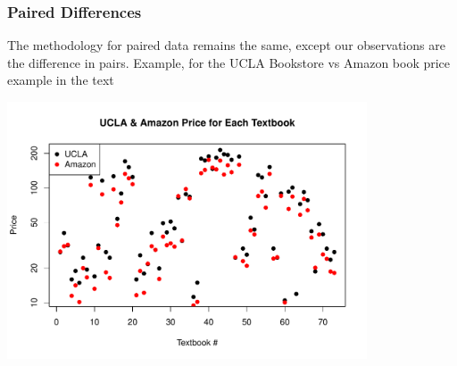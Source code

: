 \documentclass[handout]{beamer}
\newcommand{\blue}[1]{\textcolor{blue2}{#1}}
\begin{document}
%
%
\begin{frame}[fragile]
\frametitle{Paired Differences}
The methodology for paired data remains the same, except our \blue{observations} are the difference in pairs.  Example, for the UCLA Bookstore vs Amazon book price example in the text
\begin{center}
\includegraphics[width=0.8\textwidth]{figure/diff.pdf}
\end{center}


\end{frame}
\end{document}
